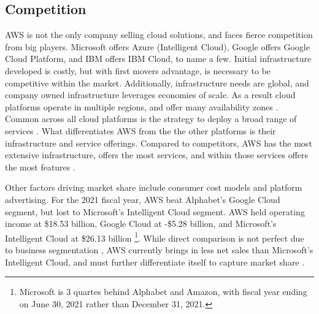 \documentclass[a4paper, 12pt]{article}
\begin{document}
\subsection{Competition}
AWS is not the only company selling cloud solutions, and faces fierce competition from big players.
Microsoft offers Azure (Intelligent Cloud), Google offers Google Cloud Platform, and IBM offers IBM Cloud, to name a few.
Initial infrastructure developed is costly, but with first movers advantage, is necessary to be competitive within the market.
Additionally, infrastructure needs are global, and company owned infrastructure leverages economies of scale.
As a result cloud platforms operate in multiple regions, and offer many availability zones \cite{AMZN_AWS_GLOBAL_INFRA, GOOG_GCP_GLOBAL_INFRA, MSFT_AZURE_GLOBAL_INFRA}.
Common across all cloud platforms is the strategy to deploy a broad range of services \cite{AMZN_AWS_CLOUD_PRODUCTS, GOOG_GCP_CLOUD_PRODUCTS, MSFT_AZURE_CLOUD_PRODUCTS}.
What differentiates AWS from the the other platforms is their infrastructure and service offerings.
Compared to competitors, AWS has the most extensive infrastructure, offers the most services, and within those services offers the most features \cite{AMZN_AWS_CLOUD_COMPUTE}.

Other factors driving market share include consumer cost models and platform advertising.
For the 2021 fiscal year, AWS beat Alphabet's Google Cloud segment, but lost to Microsoft's Intelligent Cloud segment.
AWS held operating income at \$18.53 billion, Google Cloud at -\$5.28 billion, and Microsoft's Intelligent Cloud at \$26.13 billion \cite[p~.24, p.~38, p.~44]{AMZN_10K_2021, GOOG_10K_2021, MSFT_10K_2021} \footnote{Microsoft is 3 quartes behind Alphabet and Amazon, with fiscal year ending on June 30, 2021 rather than December 31, 2021.}.
While direct comparison is not perfect due to business segmentation \cite[p.~64, p.~41, p.~21]{AMZN_ANNUAL_2021, GOOG_ANNUAL_REPORT_2021, MSFT_ANNUAL_REPORT_2022}, AWS currently brings in less net sales than Microsoft's Intelligent Cloud, and must further differentiate itself to capture market share \cite[p.~65, p.~44]{AMZN_10K_2021, MSFT_10K_2021}.

\end{document}
